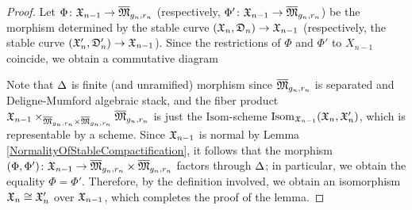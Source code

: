 \begin{proof}
  Let $\Phi \colon \mathfrak{X}_{n - 1} \to \overline{\mathfrak{M}}_{g_n, r_n}$ (respectively, $\Phi' \colon \mathfrak{X}_{n - 1} \to \overline{\mathfrak{M}}_{g_n, r_n}$) be the morphism determined by the stable curve $(\mathfrak{X}_n, \mathfrak{D}_n) \to \mathfrak{X}_{n - 1}$ (respectively, the stable curve $(\mathfrak{X}'_n, \mathfrak{D}'_n) \to \mathfrak{X}_{n - 1}$). Since the restrictions of $\Phi$ and $\Phi'$ to $X_{n - 1}$ coincide, we obtain a commutative diagram
  \begin{center}
  \end{center}
  Note that $\Delta$ is finite (and unramified) morphism since $\overline{\mathfrak{M}}_{g_n, r_n}$ is separated and Deligne-Mumford algebraic stack, and the fiber product $\mathfrak{X}_{n - 1} \times_{\overline{\mathfrak{M}}_{g_n, r_n} \times \overline{\mathfrak{M}}_{g_n, r_n}} \overline{\mathfrak{M}}_{g_n, r_n}$ is just the $\mathrm{Isom}$-scheme $\mathrm{Isom}_{\mathfrak{X}_{n - 1}}(\mathfrak{X}_n, \mathfrak{X}'_n)$, which is representable by a scheme. Since $\mathfrak{X}_{n - 1}$ is normal by Lemma \ref{NormalityOfStableCompactification}, it follows that the morphism $(\Phi, \Phi') \colon \mathfrak{X}_{n - 1} \to \overline{\mathfrak{M}}_{g_n, r_n} \times \overline{\mathfrak{M}}_{g_n, r_n}$ factors through $\Delta$; in particular, we obtain the equality $\Phi = \Phi'$. Therefore, by the definition involved, we obtain an isomorphism $\mathfrak{X}_n \cong \mathfrak{X}'_n$ over $\mathfrak{X}_{n - 1}$, which completes the proof of the lemma.
\end{proof}


